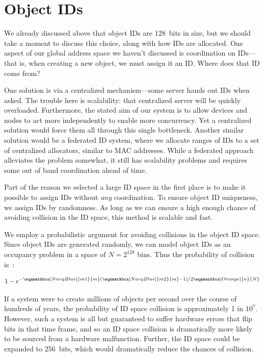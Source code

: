 \section{Object IDs}

We already discussed above that object IDs are 128~bits in size, but we should take a moment to discuss this choice,
along with how IDs are allocated. One aspect of our global address space we haven't discussed is coordination on IDs---that is,
when creating a new object, we must assign it an ID. Where does that ID come from?

One solution is via a centralized mechanism---some server hands out IDs when asked. The trouble here is scalability:
that centralized server will be quickly overloaded. Furthermore, the stated aim of our system is to allow devices and
nodes to act more independently to enable more concurrency. Yet a centralized solution would force them all through this
single bottleneck. Another similar solution would be a federated ID system, where we allocate ranges of IDs to a set of
centralized allocators, similar to MAC addresses. While a federated approach alleviates the problem somewhat, it still
has scalability problems and requires some out of band coordination ahead of time.

Part of the reason we selected a large ID space in the first place is to make it possible to assign IDs without
\emph{any} coordination. To ensure object ID uniqueness, we assign IDs by randomness. As long as we can ensure a high
enough chance of avoiding collision in the ID space, this method is scalable and fast.

We employ a probabilistic argument for avoiding collisions in the
object ID space. Since object IDs are generated randomly, we can model object IDs as an occupancy
problem in a space of $N = 2^{128}$ bins. Thus the probability of collision
is~\cite{motwani95}:

\begin{gather*}
    1 - e^{-
            \eqnmarkbox[NavyBlue]{m1}{m}
            (
            \eqnmarkbox[NavyBlue]{m2}{m}
            -1) / 2
            \eqnmarkbox[Orange]{n}{N}
        }
\end{gather*}

If a system were to create millions of objects per second over the course of hundreds of years, the
probability of ID space collision is approximately 1 in $10^{7}$. However, such a system is all but
guaranteed to suffer hardware errors that flip bits in that time frame, and so an ID space collision is dramatically more likely to be
sourced from a hardware malfunction. Further, the ID space
could be expanded to 256~bits, which would dramatically reduce the chances of collision.

